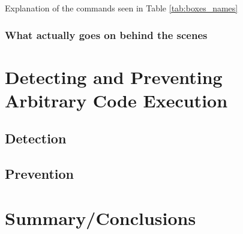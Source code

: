\documentclass[a4paper]{usiinfbachelorproject}
\begin{document}
\begin{table}
	\label{tab:boxes_names_explanation}
	\caption{Explanation of the commands seen in Table \ref{tab:boxes_names}}
\end{table}


\subsubsection{\textbf{What actually goes on behind the scenes}}
\label{sec:behind_the_scenes}


\section{Detecting and Preventing Arbitrary Code Execution}
\label{sec:state_of_the_art}
\subsection{Detection}
\label{sec:today}


\subsection{Prevention}
\label{sec:current_studies}







\newpage

\section{\textbf{Summary/Conclusions}}






\newpage
\end{document}
